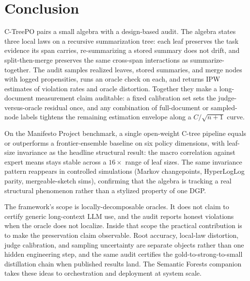 \section{Conclusion}\label{sec:min-conclusion}

C-TreePO pairs a small algebra with a design-based audit. The algebra
states three local laws on a recursive summarization tree: each leaf
preserves the task evidence its span carries, re-summarizing a stored
summary does not drift, and split-then-merge preserves the same cross-span
interactions as summarize-together. The audit samples realized leaves,
stored summaries, and merge nodes with logged propensities, runs an oracle
check on each, and returns IPW estimates of violation rates and oracle
distortion. Together they make a long-document measurement claim
auditable: a fixed calibration set sets the judge-versus-oracle residual
once, and any combination of full-document or sampled-node labels
tightens the remaining estimation envelope along a $C/\sqrt{n+1}$ curve.

On the Manifesto Project benchmark, a single open-weight C-tree
pipeline equals or outperforms a frontier-ensemble baseline on six
policy dimensions, with leaf-size invariance as the headline
structural result: the macro correlation against expert means stays
stable across a $16\times$ range of leaf sizes. The same invariance pattern reappears in
controlled simulations (Markov changepoints, HyperLogLog parity,
mergeable-sketch sims), confirming that the algebra is tracking a real
structural phenomenon rather than a stylized property of one DGP.

The framework's scope is locally-decomposable oracles. It does not claim
to certify generic long-context LLM use, and the audit reports honest
violations when the oracle does not localize. Inside that scope the
practical contribution is to make the preservation claim observable.
Root accuracy, local-law distortion, judge calibration, and sampling
uncertainty are separate objects rather than one hidden engineering step,
and the same audit certifies the gold-to-strong-to-small distillation
chain when published results land. The Semantic Forests companion takes
these ideas to orchestration and deployment at system scale.
